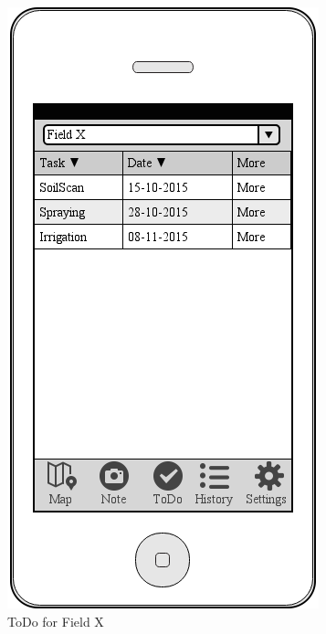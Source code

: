 \documentclass[12pt]{article}
\begin{document}
\begin{figure}[ht]
	\includegraphics[width=\linewidth, height=0.4\textheight, keepaspectratio=true]{mockups/ToDoFieldX.png}
	\caption{ToDo for Field X}
	\endminipage\hfill
	\centering

\end{figure}
\end{document}
